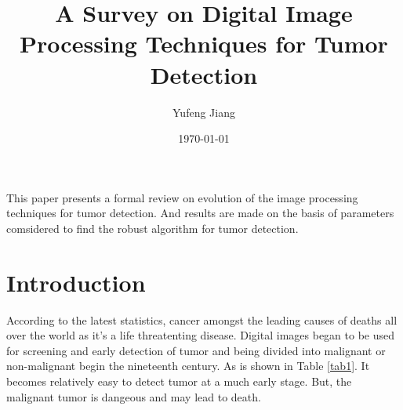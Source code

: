 \documentclass[a4paper,twocolumn]{article}
\title{A Survey on Digital Image Processing Techniques for Tumor Detection}
\author{Yufeng Jiang}
\date{\today}
\begin{document}
\balance
\maketitle
This paper presents a formal review on evolution of the image processing techniques for tumor detection. And results are made on the basis of parameters comsidered to find the robust algorithm for tumor detection.\\
\section{Introduction}
According to the latest statistics, cancer amongst the leading causes of deaths all over the world as it's a life threatenting disease. Digital images began to be used for screening and early detection of tumor and being divided into malignant or non-malignant begin the nineteenth century. As is shown in Table \ref{tab1}. It becomes relatively easy to detect tumor at a much early stage. But, the malignant tumor is dangeous and may lead to death.\\
\end{document}
